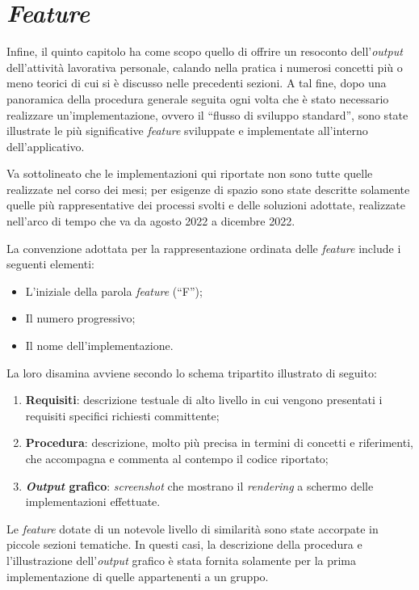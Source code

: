 
\chapter{\textit{Feature}}
Infine, il quinto capitolo ha come scopo quello di offrire un resoconto dell'\textit{output} dell'attività lavorativa personale, calando nella pratica i numerosi concetti più o meno teorici di cui si è discusso nelle precedenti sezioni. A tal fine, dopo una panoramica della procedura generale seguita ogni volta che è stato necessario realizzare un'implementazione, ovvero il “flusso di sviluppo standard”, sono state illustrate le più significative \textit{feature} sviluppate e implementate all'interno dell'applicativo.

Va sottolineato che le implementazioni qui riportate non sono tutte quelle realizzate nel corso dei mesi; per esigenze di spazio sono state descritte solamente quelle più rappresentative dei processi svolti e delle soluzioni adottate, realizzate nell'arco di tempo che va da agosto 2022 a dicembre 2022.

La convenzione adottata per la rappresentazione ordinata delle \textit{feature} include i seguenti elementi:
\begin{itemize}
    \item L'iniziale della parola \textit{feature} (“F”);
    \item Il numero progressivo;
    \item Il nome dell'implementazione.
\end{itemize}
La loro disamina avviene secondo lo schema tripartito illustrato di seguito: 
\begin{enumerate}
    \item \textbf{Requisiti}: descrizione testuale di alto livello in cui vengono presentati i requisiti specifici richiesti committente;
    
    \item \textbf{Procedura}: descrizione, molto più precisa in termini di concetti e riferimenti, che accompagna e commenta al contempo il codice riportato;
    
    \item \textbf{\textit{Output} grafico}: \textit{screenshot} che mostrano il \textit{rendering} a schermo delle implementazioni effettuate.
\end{enumerate}
Le \textit{feature} dotate di un notevole livello di similarità sono state accorpate in piccole sezioni tematiche. In questi casi, la descrizione della procedura e l'illustrazione dell'\textit{output} grafico è stata fornita solamente per la prima implementazione di quelle appartenenti a un gruppo.

